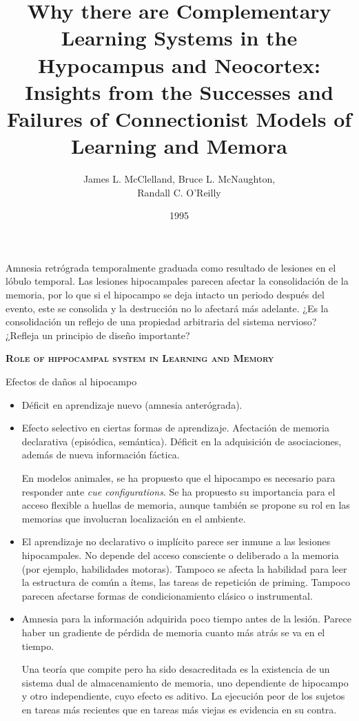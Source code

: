 \documentclass[a4paper,12pt]{article}
\title{Why there are Complementary Learning Systems in the Hypocampus and Neocortex: Insights from the Successes and Failures of Connectionist Models of Learning and Memora}
\author{James L. McClelland, Bruce L. McNaughton,\\Randall C. O'Reilly}
\date{1995}
\begin{document}
{\scshape\bfseries \maketitle}

Amnesia retrógrada temporalmente graduada como resultado de lesiones en el lóbulo temporal. Las lesiones hipocampales parecen afectar la consolidación de la memoria, por lo que si el hipocampo se deja intacto un periodo después del evento, este se consolida y la destrucción no lo afectará más adelante. ¿Es la consolidación un reflejo de una propiedad arbitraria del sistema nervioso? ¿Refleja un principio de diseño importante?

{\scshape\bfseries Role of hippocampal system in Learning and Memory}

Efectos de daños al hipocampo
\begin{itemize}
	\item Déficit en aprendizaje nuevo (amnesia anterógrada).
	\item Efecto selectivo en ciertas formas de aprendizaje. Afectación de memoria declarativa (episódica, semántica). Déficit en la adquisición de asociaciones, además de nueva información fáctica.

		En modelos animales, se ha propuesto que el hipocampo es necesario para responder ante {\itshape cue configurations}. Se ha propuesto su importancia para el acceso flexible a huellas de memoria, aunque también se propone su rol en las memorias que involucran localización en el ambiente. 
	\item El aprendizaje no declarativo o implícito parece ser inmune a las lesiones hipocampales. No depende del acceso consciente o deliberado a la memoria (por ejemplo, habilidades motoras). Tampoco se afecta la habilidad para leer la estructura de común a ítems, las tareas de repetición de priming. Tampoco parecen afectarse formas de condicionamiento clásico o instrumental.
	\item Amnesia para la información adquirida poco tiempo antes de la lesión. Parece haber un gradiente de pérdida de memoria cuanto más atrás se va en el tiempo.

		Una teoría que compite pero ha sido desacreditada es la existencia de un sistema dual de almacenamiento de memoria, uno dependiente de hipocampo y otro independiente, cuyo efecto es aditivo. La ejecución peor de los sujetos en tareas más recientes que en tareas más viejas es evidencia en su contra.
\end{itemize}
\end{document}
